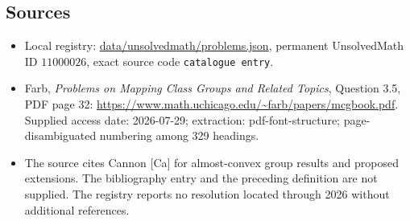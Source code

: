 \documentclass[11pt]{article}
\begin{document}
\subsection{Sources}
\begin{itemize}
\item Local registry: \url{data/unsolvedmath/problems.json}, permanent UnsolvedMath ID $11000026$, exact source code \texttt{catalogue entry}.
\item Farb, \emph{Problems on Mapping Class Groups and Related Topics}, Question 3.5, PDF page 32: \url{https://www.math.uchicago.edu/~farb/papers/mcgbook.pdf}. Supplied access date: 2026-07-29; extraction: pdf-font-structure; page-disambiguated numbering among 329 headings.
\item The source cites Cannon [Ca] for almost-convex group results and proposed extensions. The bibliography entry and the preceding definition are not supplied. The registry reports no resolution located through 2026 without additional references.
\end{itemize}
\end{document}
